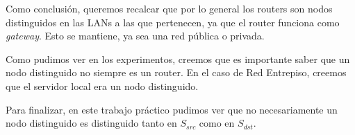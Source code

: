 Como conclusión, queremos recalcar que por lo general los routers son nodos distinguidos en las LANs a las que pertenecen, ya que el router funciona como \emph{gateway}. Esto se mantiene, ya sea una red pública o privada.

Como pudimos ver en los experimentos, creemos que es importante saber que un nodo distinguido no siempre es un router. En el caso de Red Entrepiso, creemos que el servidor local era un nodo distinguido.

Para finalizar, en este trabajo práctico pudimos ver que no necesariamente un nodo distinguido es distinguido tanto en $S_{src}$ como en $S_{dst}$.

